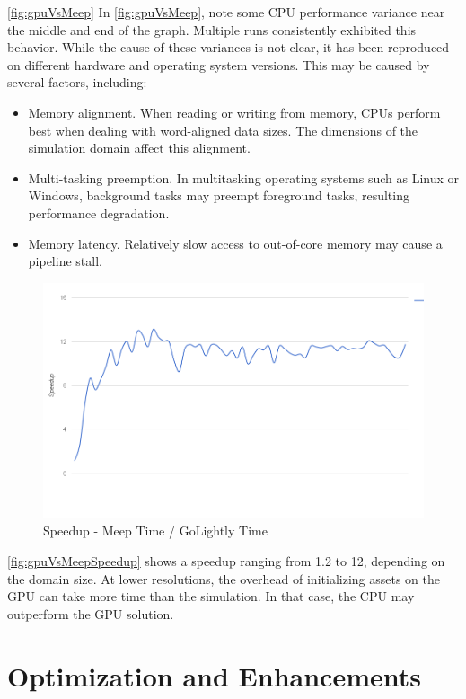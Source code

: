 \autoref{fig:gpuVsMeep} 
In \autoref{fig:gpuVsMeep}, note some CPU performance variance near the middle and end of the graph. Multiple runs consistently exhibited this behavior. While the cause of these variances is not clear, it has been reproduced on different hardware and operating system versions. 
This may be caused by several factors, including:

\begin{itemize}
	\item Memory alignment. When reading or writing from memory, CPUs perform best when dealing with word-aligned data sizes. The dimensions of the simulation domain affect this alignment.
	\item Multi-tasking preemption. In multitasking operating systems such as Linux or Windows, background tasks may preempt foreground tasks, resulting performance degradation. 
	\item Memory latency. Relatively slow access to out-of-core memory may cause a pipeline stall.	
\end{itemize}


\begin{figure}[H]
	\centering
	\includegraphics[width=\textwidth,
	keepaspectratio]{gpu-vs-meep-speedup.png}
	\caption{Speedup - Meep Time / GoLightly Time}
	\label{fig:gpuVsMeepSpeedup}
\end{figure}

\autoref{fig:gpuVsMeepSpeedup} shows a speedup ranging from 1.2 to 12, depending on the domain size. At lower resolutions, the overhead of initializing assets on the GPU can take more time than the simulation. In that case, the CPU may outperform the GPU solution.

\section{Optimization and Enhancements}

